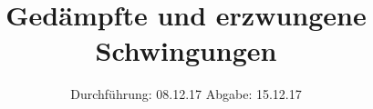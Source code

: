 

\subject{V354}
\title{Gedämpfte und erzwungene Schwingungen}
\date{%
  Durchführung: 08.12.17
  \hspace{3em}
  Abgabe: 15.12.17
}



\maketitle
\thispagestyle{empty}
\tableofcontents
\newpage






\printbibliography{}


